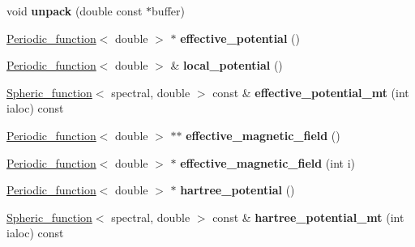 \begin{DoxyCompactItemize}
\item 
\hypertarget{classsirius_1_1_potential_adcc8dc4110691d5f463615e4136cbcab}{}void {\bfseries unpack} (double const $\ast$buffer)\label{classsirius_1_1_potential_adcc8dc4110691d5f463615e4136cbcab}

\item 
\hypertarget{classsirius_1_1_potential_a443f5d205079f20dce528b54578366e0}{}\hyperlink{classsirius_1_1_periodic__function}{Periodic\+\_\+function}$<$ double $>$ $\ast$ {\bfseries effective\+\_\+potential} ()\label{classsirius_1_1_potential_a443f5d205079f20dce528b54578366e0}

\item 
\hypertarget{classsirius_1_1_potential_a168c22ea67abc3e469df4edbcd014329}{}\hyperlink{classsirius_1_1_periodic__function}{Periodic\+\_\+function}$<$ double $>$ \& {\bfseries local\+\_\+potential} ()\label{classsirius_1_1_potential_a168c22ea67abc3e469df4edbcd014329}

\item 
\hypertarget{classsirius_1_1_potential_a07b930da44036d4e39309178206b2d5a}{}\hyperlink{classsirius_1_1_spheric__function}{Spheric\+\_\+function}$<$ spectral, double $>$ const \& {\bfseries effective\+\_\+potential\+\_\+mt} (int ialoc) const \label{classsirius_1_1_potential_a07b930da44036d4e39309178206b2d5a}

\item 
\hypertarget{classsirius_1_1_potential_af844022ac55fcc4d585a18eba63f2392}{}\hyperlink{classsirius_1_1_periodic__function}{Periodic\+\_\+function}$<$ double $>$ $\ast$$\ast$ {\bfseries effective\+\_\+magnetic\+\_\+field} ()\label{classsirius_1_1_potential_af844022ac55fcc4d585a18eba63f2392}

\item 
\hypertarget{classsirius_1_1_potential_a45f621d622fd4504da2034cc1095ee21}{}\hyperlink{classsirius_1_1_periodic__function}{Periodic\+\_\+function}$<$ double $>$ $\ast$ {\bfseries effective\+\_\+magnetic\+\_\+field} (int i)\label{classsirius_1_1_potential_a45f621d622fd4504da2034cc1095ee21}

\item 
\hypertarget{classsirius_1_1_potential_ab1a2076417d10b35cf5c60d58c3c34c7}{}\hyperlink{classsirius_1_1_periodic__function}{Periodic\+\_\+function}$<$ double $>$ $\ast$ {\bfseries hartree\+\_\+potential} ()\label{classsirius_1_1_potential_ab1a2076417d10b35cf5c60d58c3c34c7}

\item 
\hypertarget{classsirius_1_1_potential_a1db6a3e2ad5caa83cf42abb7db07b076}{}\hyperlink{classsirius_1_1_spheric__function}{Spheric\+\_\+function}$<$ spectral, double $>$ const \& {\bfseries hartree\+\_\+potential\+\_\+mt} (int ialoc) const \label{classsirius_1_1_potential_a1db6a3e2ad5caa83cf42abb7db07b076}


\end{DoxyCompactItemize}
